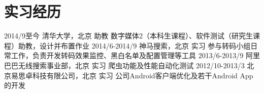 \documentclass[]{friggeri-cv}
\begin{document}

\section{实习经历}

\begin{entrylist}
  \entry
    {2014/9至今}
    {清华大学，北京}
    {助教}
    {数字媒体2（本科生课程）、软件测试（研究生课程）助教，设计并布置作业}
  \entry
    {2014/6-2014/9}
    {神马搜索，北京}
    {实习}
    {参与转码小组日常工作，负责开发转码效果监控、黑白名单及配置管理等工具}
  \entry
    {2013/6-2013/9}
    {阿里巴巴无线搜索事业部，北京}
    {实习}
    {爬虫功能及性能自动化测试}
  \entry
    {2012/10-2013/3}
    {北京易思卓科技有限公司，北京}
    {实习}
    {公司Android客户端优化及若干Android App的开发}
\end{entrylist}
\end{document}
